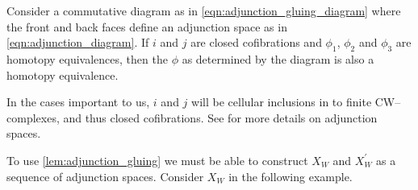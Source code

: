 \documentclass[class=article, crop=false]{standalone}
\begin{document}
\begin{lemma}
    Consider a commutative diagram as in \eqref{eqn:adjunction_gluing_diagram} where the front and back faces define an adjunction space as in \eqref{eqn:adjunction_diagram}. If $i$ and $j$ are closed cofibrations and $\phi_1$, $\phi_2$ and $\phi_3$ are homotopy equivalences, then the $\phi$ as determined by the diagram is also a homotopy equivalence.
    \label{lem:adjunction_gluing}
\end{lemma}

In the cases important to us, $i$ and $j$ will be cellular inclusions in to finite CW--complexes, and thus closed cofibrations. See \cite{brown_topology_2006} for more details on adjunction spaces.

To use \cref{lem:adjunction_gluing} we must be able to construct $X_W$ and $X_W^\prime$ as a sequence of adjunction spaces. Consider $X_W$ in the following example.
\end{document}
